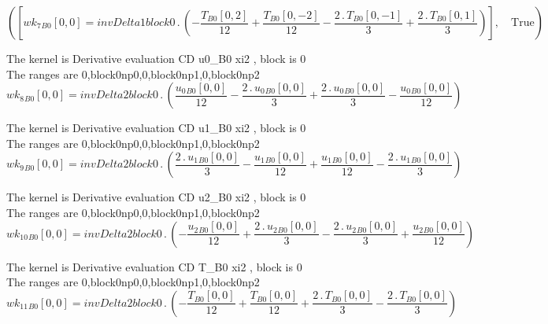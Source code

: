 \documentclass{article}
\begin{document}
\begin{dmath}\left ( \left [ {wk_{7}{_{B0}}}[{0,0}] = invDelta1block0 \,.\, \left(- \frac{{T{_{B0}}}[{0,2}]}{12} + \frac{{T{_{B0}}}[{0,-2}]}{12} - \frac{2 \,.\, {T{_{B0}}}[{0,-1}]}{3} + \frac{2 \,.\, {T{_{B0}}}[{0,1}]}{3}\right)\right ], \quad 
\mathrm{True}\right )\end{dmath}

\noindent The kernel is Derivative evaluation CD u0_B0 xi2 , block is 0\\\noindent The ranges are 0,block0np0,0,block0np1,0,block0np2\\\begin{dmath}{wk_{8}{_{B0}}}[{0,0}] = invDelta2block0 \,.\, \left(\frac{{u_{0}{_{B0}}}[{0,0}]}{12} - \frac{2 \,.\, {u_{0}{_{B0}}}[{0,0}]}{3} + \frac{2 \,.\, {u_{0}{_{B0}}}[{0,0}]}{3} - \frac{{u_{0}{_{B0}}}[{0,0}]}{12}\right)\end{dmath}

\noindent The kernel is Derivative evaluation CD u1_B0 xi2 , block is 0\\\noindent The ranges are 0,block0np0,0,block0np1,0,block0np2\\\begin{dmath}{wk_{9}{_{B0}}}[{0,0}] = invDelta2block0 \,.\, \left(\frac{2 \,.\, {u_{1}{_{B0}}}[{0,0}]}{3} - \frac{{u_{1}{_{B0}}}[{0,0}]}{12} + \frac{{u_{1}{_{B0}}}[{0,0}]}{12} - \frac{2 \,.\, {u_{1}{_{B0}}}[{0,0}]}{3}\right)\end{dmath}

\noindent The kernel is Derivative evaluation CD u2_B0 xi2 , block is 0\\\noindent The ranges are 0,block0np0,0,block0np1,0,block0np2\\\begin{dmath}{wk_{10}{_{B0}}}[{0,0}] = invDelta2block0 \,.\, \left(- \frac{{u_{2}{_{B0}}}[{0,0}]}{12} + \frac{2 \,.\, {u_{2}{_{B0}}}[{0,0}]}{3} - \frac{2 \,.\, {u_{2}{_{B0}}}[{0,0}]}{3} + \frac{{u_{2}{_{B0}}}[{0,0}]}{12}\right)\end{dmath}

\noindent The kernel is Derivative evaluation CD T_B0 xi2 , block is 0\\\noindent The ranges are 0,block0np0,0,block0np1,0,block0np2\\\begin{dmath}{wk_{11}{_{B0}}}[{0,0}] = invDelta2block0 \,.\, \left(- \frac{{T{_{B0}}}[{0,0}]}{12} + \frac{{T{_{B0}}}[{0,0}]}{12} + \frac{2 \,.\, {T{_{B0}}}[{0,0}]}{3} - \frac{2 \,.\, {T{_{B0}}}[{0,0}]}{3}\right)\end{dmath}
\end{document}
